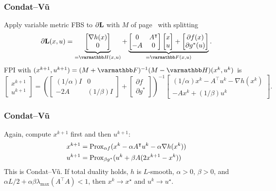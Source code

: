 \documentclass[10pt,mathserif]{beamer}
\begin{document}
\begin{frame}
\frametitle{Condat--V\~u}
Apply variable metric FBS to $\partial \mathbf{L}$ with $M$ of page~\pageref{frame_pdhg2} with splitting
\[
\partial \lagrange(x, u )
=
\underbrace{
\begin{bmatrix}
\nabla h(x)\\
0
\end{bmatrix}}
_{=\opH(x, u )}
+
\underbrace{
\begin{bmatrix}
0&A^\intercal\\
-A&0
\end{bmatrix}
\begin{bmatrix}
x\\
 u 
\end{bmatrix}
+
\begin{bmatrix}
\partial f(x)\\
\partial g^*( u )
\end{bmatrix}
}
_{=\opF(x, u )}.
\]
 FPI with $(x^{k+1}, u ^{k+1})=(M+\opF)^{-1}(M-\opH)(x^{k}, u ^{k})$ is
\[
\begin{bmatrix}
x^{k+1}\\
 u ^{k+1}
\end{bmatrix}=
\left(
\begin{bmatrix}
(1/\alpha) I&0\\
-2A&(1/\beta) I
\end{bmatrix}
+
\begin{bmatrix}
\partial f\\
\partial g^*
\end{bmatrix}
\right)^{-1}
\begin{bmatrix}
(1/\alpha) x^k-A^\intercal u ^k-\nabla h(x^k)\\
-Ax^k+(1/\beta)  u ^k
\end{bmatrix}.
\]
\end{frame}

\begin{frame}
\frametitle{Condat--V\~u}
Again, compute $x^{k+1}$ first and then $ u ^{k+1}$:
\begin{align*}
x^{k+1}&=
\mathrm{Prox}_{\alpha f}(x^k-\alpha A^\intercal u ^k-\alpha \nabla h(x^k))\\
 u ^{k+1}&=
\mathrm{Prox}_{\beta g^*}( u ^k+\beta A(2x^{k+1}-x^k))
\end{align*}
This is Condat--V\~u.
If total duality holds, $h$ is $L$-smooth, $\alpha>0$, $\beta>0$, and
$\alpha L/2+\alpha \beta \lambda_\mathrm{max}(A^\intercal A)<1$,
then $x^k\rightarrow x^\star$ and $ u ^k\rightarrow  u ^\star$.
\end{frame}
\end{document}

